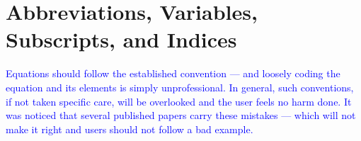 \documentclass[phd]{ndsu-thesis-2022}
\newcommand\italk[1]{\textcolor{blue}{#1}}  %
\begin{document}

\section{Abbreviations, Variables, Subscripts, and Indices}
\italk{Equations should follow the established convention --- and loosely coding the equation and its elements is simply unprofessional. In general, such conventions, if not taken specific care, will be overlooked and the user feels no harm done. It was noticed that several published papers carry these mistakes --- which will not make it right and users should not follow a bad example.}
\end{document}

